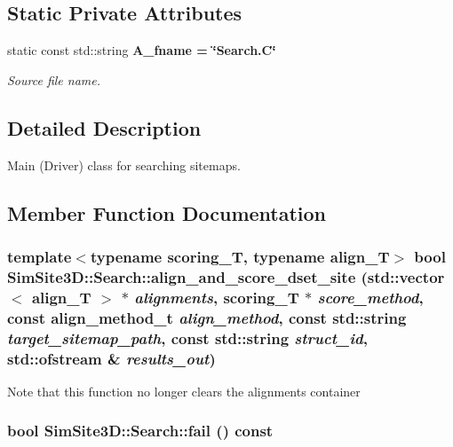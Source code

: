 \subsection*{Static Private Attributes}
\begin{CompactItemize}
\item 
static const std::string \bf{A\_\-fname} = \char`\"{}Search.C\char`\"{}\label{classSimSite3D_1_1Search_f7e20ddc101c1e6165e3b00a2e0eeb82}

\begin{CompactList}\small\item\em Source file name. \item\end{CompactList}\end{CompactItemize}


\subsection{Detailed Description}
Main (Driver) class for searching sitemaps. 



\subsection{Member Function Documentation}
\subsubsection{\setlength{\rightskip}{0pt plus 5cm}template$<$typename scoring\_\-T, typename align\_\-T$>$ bool SimSite3D::Search::align\_\-and\_\-score\_\-dset\_\-site (std::vector$<$ align\_\-T $>$ $\ast$ {\em alignments}, scoring\_\-T $\ast$ {\em score\_\-method}, const align\_\-method\_\-t {\em align\_\-method}, const std::string {\em target\_\-sitemap\_\-path}, const std::string {\em struct\_\-id}, std::ofstream \& {\em results\_\-out})\hspace{0.3cm}{\tt  [inline, private]}}\label{classSimSite3D_1_1Search_fd59641ac1b15dd60260cdc03455068d}


Note that this function no longer clears the alignments container 
\subsubsection{\setlength{\rightskip}{0pt plus 5cm}bool SimSite3D::Search::fail () const\hspace{0.3cm}{\tt  [inline]}}\label{classSimSite3D_1_1Search_829f1f284ce32f03af0d34bdf6ccfab4}


